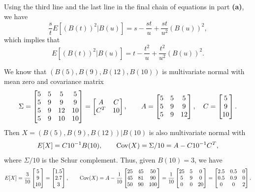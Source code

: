 \documentclass{homework}
\begin{document}
\begin{alphaparts}
		\questionpart Using the third line and the last line in the final chain of equations in part \textbf{(a)}, we have
		\begin{equation*}
			\frac{s}{t}E\left[(B(t))^2|B(u)\right] = s - \frac{st}{u} + \frac{st}{u^2}(B(u))^2,
		\end{equation*}
		which implies that
		\begin{equation*}
			E\left[(B(t))^2|B(u)\right] = t - \frac{t^2}{u} + \frac{t^2}{u^2}(B(u))^2.
		\end{equation*}
	\end{alphaparts}
	
	\question We know that $(B(5), B(9), B(12), B(10))$ is multivariate normal with mean zero and covariance matrix
	\begin{equation*}
		\Sigma = \left[\begin{matrix}
			5 & 5 & 5 & 5 \\
			5 & 9 & 9 & 9 \\
			5 & 9 & 12 & 10 \\
			5 & 9 & 10 & 10
		\end{matrix}\right] = \left[\begin{matrix}A & C \\ C^T & 10\end{matrix}\right], \qquad A = \left[\begin{matrix}5 & 5 & 5 \\ 5 & 9 & 9 \\ 5 & 9 & 12\end{matrix}\right], \quad C = \left[\begin{matrix}5 \\ 9 \\ 10\end{matrix}\right].
	\end{equation*}
	Then $X = (B(5), B(9), B(12)) | B(10)$ is also multivariate normal with
	\begin{equation*}
		E[X] = C10^{-1}B(10), \qquad \mathrm{Cov}(X) = \Sigma / 10 = A - C10^{-1}C^T,
	\end{equation*}
	where $\Sigma / 10$ is the Schur complement. Thus, given $B(10) = 3$, we have
	\begin{equation*}
		E[X] = \frac{3}{10}\left[\begin{matrix}5\\9\\10\end{matrix}\right] = \left[\begin{matrix}1.5 \\ 2.7 \\ 3\end{matrix}\right], \qquad \mathrm{Cov}(X) = A - \frac{1}{10}\left[\begin{matrix}25 & 45 & 50 \\ 45 & 81 & 90 \\ 50 & 90 & 100\end{matrix}\right] = \frac{1}{10}\left[\begin{matrix}25 & 5 &  0 \\ 5 & 9 & 0 \\ 0 & 0 &20\end{matrix}\right] = \left[\begin{matrix}2.5 & 0.5 & 0 \\ 0.5 & 0.9 & 0 \\ 0 & 0 & 2\end{matrix}\right].
	\end{equation*}
	
\end{document}

